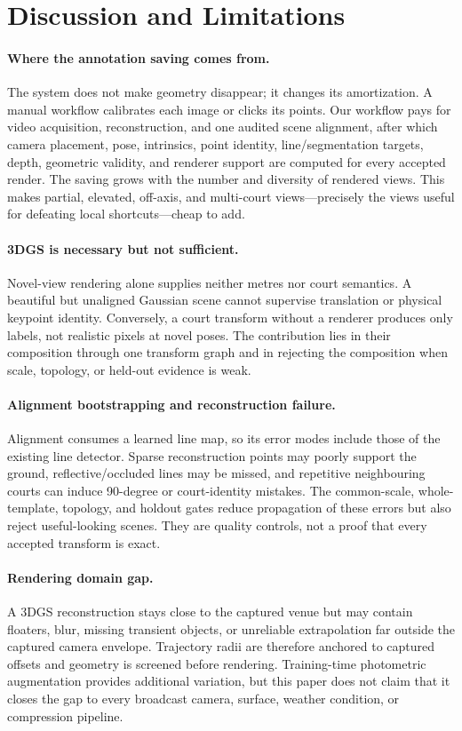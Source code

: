 \section{Discussion and Limitations}
\label{sec:discussion}

\paragraph{Where the annotation saving comes from.}
The system does not make geometry disappear; it changes its amortization.  A
manual workflow calibrates each image or clicks its points.  Our workflow pays
for video acquisition, reconstruction, and one audited scene alignment, after
which camera placement, pose, intrinsics, point identity, line/segmentation
targets, depth, geometric validity, and renderer support are computed for every
accepted render.  The
saving grows with the number and diversity of rendered views.  This makes
partial, elevated, off-axis, and multi-court views---precisely the views useful
for defeating local shortcuts---cheap to add.

\paragraph{3DGS is necessary but not sufficient.}
Novel-view rendering alone supplies neither metres nor court semantics.  A
beautiful but unaligned Gaussian scene cannot supervise translation or physical
keypoint identity.  Conversely, a court transform without a renderer produces
only labels, not realistic pixels at novel poses.  The contribution lies in
their composition through one transform graph and in rejecting the composition
when scale, topology, or held-out evidence is weak.

\paragraph{Alignment bootstrapping and reconstruction failure.}
Alignment consumes a learned line map, so its error modes include those of the
existing line detector.  Sparse reconstruction points may poorly support the
ground, reflective/occluded lines may be missed, and repetitive neighbouring
courts can induce 90-degree or court-identity mistakes.  The common-scale,
whole-template, topology, and holdout gates reduce propagation of these errors
but also reject useful-looking scenes.  They are quality controls, not a proof
that every accepted transform is exact.

\paragraph{Rendering domain gap.}
A 3DGS reconstruction stays close to the captured venue but may contain floaters,
blur, missing transient objects, or unreliable extrapolation far outside the
captured camera envelope.  Trajectory radii are therefore anchored to captured
offsets and geometry is screened before rendering.  Training-time photometric
augmentation provides additional variation, but this paper does not claim that
it closes the gap to every broadcast camera, surface, weather condition, or
compression pipeline.

